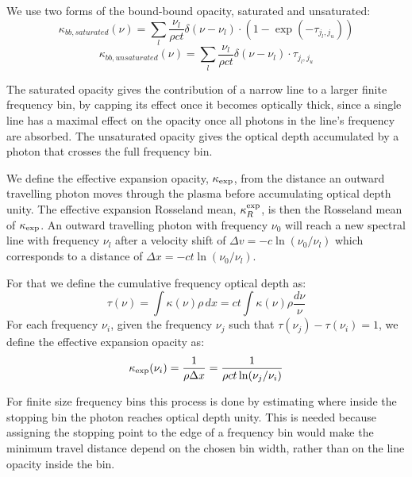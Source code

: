 \documentclass[final,5p,times,twocolumn]{elsarticle}
\begin{document}
    We use two forms of the bound-bound opacity, saturated and unsaturated:
    \begin{equation}
        \kappa_{bb,saturated}(\nu) = \sum_l \frac{\nu_l}{\rho c t} \delta(\nu - \nu_{l}) \cdot (1 - \exp(-\tau_{j_l,j_u}))
    \end{equation}
    \begin{equation}
        \kappa_{bb,unsaturated}(\nu) = \sum_l \frac{\nu_l}{\rho c t} \delta(\nu - \nu_{l}) \cdot \tau_{j_l,j_u}
    \end{equation}

    The saturated opacity gives the contribution of a narrow line to a larger finite frequency bin,
    by capping its effect once it becomes optically thick, since a single line has a maximal effect on the opacity
    once all photons in the line's frequency are absorbed.
    The unsaturated opacity gives the optical depth accumulated by a photon that crosses the
    full frequency bin.

    We define the effective expansion opacity, $\kappa_{\rm exp}$, from the distance an outward travelling photon
    moves through the plasma before accumulating optical depth unity.
    The effective expansion Rosseland mean, $\kappa_R^{\rm exp}$, is then the Rosseland mean of
    $\kappa_{\rm exp}$.
    An outward travelling photon with frequency $\nu_0$ will reach a new spectral line with frequency 
    $\nu_{l}$ after a velocity shift of $\Delta v = -c \ln(\nu_0/\nu_{l})$ which corresponds to a
    distance of $\Delta x = -c t \ln(\nu_0/\nu_{l})$.

    For that we define the cumulative frequency optical depth as:
    \begin{equation}
        \tau(\nu) = \int \kappa(\nu) \rho \, dx = ct \int \kappa(\nu) \rho \frac{d\nu}{\nu}
    \end{equation}
    For each frequency $\nu_i$, given the frequency $\nu_j$ such that $\tau(\nu_j) - \tau(\nu_i) = 1$,
    we define the effective expansion opacity as:
    \begin{equation}
        \label{eq:kappa_eff_simple}
        \kappa_{\rm exp}(\nu_i) = \frac{1}{\rho \Delta x}
        = \frac{1}{\rho ct \ln(\nu_j/\nu_i)}
    \end{equation}

    For finite size frequency bins this process is done by estimating where inside the stopping
    bin the photon reaches optical depth unity. This is needed because assigning the stopping
    point to the edge of a frequency bin would make the minimum travel distance depend on the
    chosen bin width, rather than on the line opacity inside the bin.
    
\end{document}
